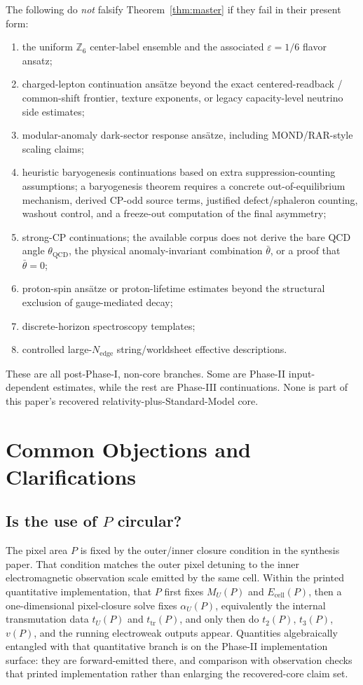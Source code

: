 \documentclass[11pt]{article}
\begin{document}
The following do \emph{not} falsify Theorem~\ref{thm:master} if they fail in their present form:
\begin{enumerate}[leftmargin=2em]
\item the uniform $\mathbb Z_6$ center-label ensemble and the associated $\varepsilon=1/6$ flavor ansatz;
\item charged-lepton continuation ans\"atze beyond the exact centered-readback / common-shift frontier, texture exponents, or legacy capacity-level neutrino side estimates;
\item modular-anomaly dark-sector response ans\"atze, including MOND/RAR-style scaling claims;
\item heuristic baryogenesis continuations based on extra suppression-counting assumptions; a baryogenesis theorem requires a concrete out-of-equilibrium mechanism, derived CP-odd source terms, justified defect/sphaleron counting, washout control, and a freeze-out computation of the final asymmetry;
\item strong-CP continuations; the available corpus does not derive the bare QCD angle \(\theta_{\mathrm{QCD}}\), the physical anomaly-invariant combination \(\bar\theta\), or a proof that \(\bar\theta=0\);
\item proton-spin ans\"atze or proton-lifetime estimates beyond the structural exclusion of gauge-mediated decay;
\item discrete-horizon spectroscopy templates;
\item controlled large-$N_{\mathrm{edge}}$ string/worldsheet effective descriptions.
\end{enumerate}
These are all post-Phase-I, non-core branches. Some are Phase-II input-dependent estimates, while the rest are Phase-III continuations. None is part of this paper's recovered relativity-plus-Standard-Model core.

\section{Common Objections and Clarifications}

\subsection{\texorpdfstring{Is the use of $P$ circular?}{Is the use of P circular?}}

The pixel area \(P\) is fixed by the outer/inner closure condition in the synthesis paper. That
condition matches the outer pixel detuning to the inner electromagnetic observation scale emitted
by the same cell. Within the printed quantitative implementation, that \(P\) first fixes \(M_U(P)\) and \(E_{\mathrm{cell}}(P)\), then a
one-dimensional pixel-closure solve fixes \(\alpha_U(P)\), equivalently the internal transmutation
data \(t_U(P)\) and \(t_{\mathrm{tr}}(P)\), and only then do \(t_2(P)\), \(t_3(P)\), \(v(P)\), and
the running electroweak outputs appear. Quantities algebraically entangled with that quantitative
branch is on the Phase-II implementation surface: they are forward-emitted there, and
comparison with observation checks that printed implementation rather than enlarging the
recovered-core claim set.
\end{document}
